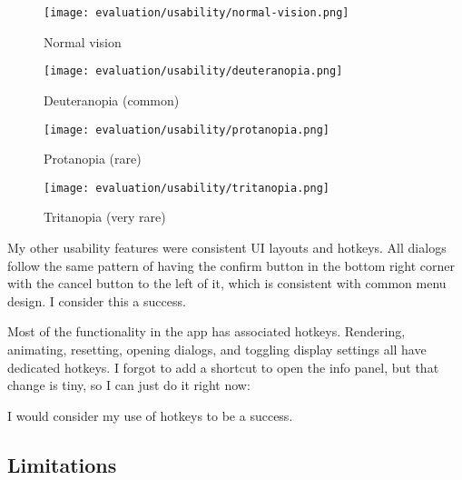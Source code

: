 \documentclass[../main.tex]{subfiles}
\begin{document}
\begin{figure}[H]
	\begin{minipage}{0.48\linewidth}
		\centering
		\texttt{[image: evaluation/usability/normal-vision.png]}
		\caption{Normal vision}
		\label{fig:evaluation:usability:normal-vision.png}
	\end{minipage}\hfill
	\begin{minipage}{0.48\linewidth}
		\centering
		\texttt{[image: evaluation/usability/deuteranopia.png]}
		\caption{Deuteranopia (common)}
		\label{fig:evaluation:usability:deuteranopia.png}
	\end{minipage}
\end{figure}
\begin{figure}[H]
	\begin{minipage}{0.48\linewidth}
		\centering
		\texttt{[image: evaluation/usability/protanopia.png]}
		\caption{Protanopia (rare)}
		\label{fig:evaluation:usability:protanopia.png}
	\end{minipage}\hfill
	\begin{minipage}{0.48\linewidth}
		\centering
		\texttt{[image: evaluation/usability/tritanopia.png]}
		\caption{Tritanopia (very rare)}
		\label{fig:evaluation:usability:tritanopia.png}
	\end{minipage}
\end{figure}

My other usability features were consistent UI layouts and hotkeys. All dialogs follow the same pattern of having the confirm button in the bottom right corner with the cancel button to the left of it, which is consistent with common menu design. I consider this a success.

Most of the functionality in the app has associated hotkeys. Rendering, animating, resetting, opening dialogs, and toggling display settings all have dedicated hotkeys. I forgot to add a shortcut to open the info panel, but that change is tiny, so I can just do it right now:


I would consider my use of hotkeys to be a success.

\subsection{Limitations\label{evaluation:limitations}}
\end{document}
